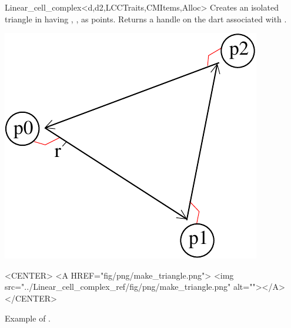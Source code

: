 \begin{ccRefClass}{Linear_cell_complex<d,d2,LCCTraits,CMItems,Alloc>}
{Creates an isolated triangle in  having , ,  as points.
   Returns a handle on the dart associated with .
}
%
\def\LargFig{.3\textwidth}
  \begin{ccTexOnly}
    \begin{center}
      \includegraphics[width=\LargFig]{Linear_cell_complex_ref/fig/pdf/make_triangle}
    \end{center}
  \end{ccTexOnly}
  \begin{ccHtmlOnly}
    <CENTER>
    <A HREF="fig/png/make_triangle.png">
        <img src="../Linear_cell_complex_ref/fig/png/make_triangle.png" alt=""></A>
    </CENTER>
    \end{ccHtmlOnly}
    \centerline{Example of .}


\end{ccRefClass}
